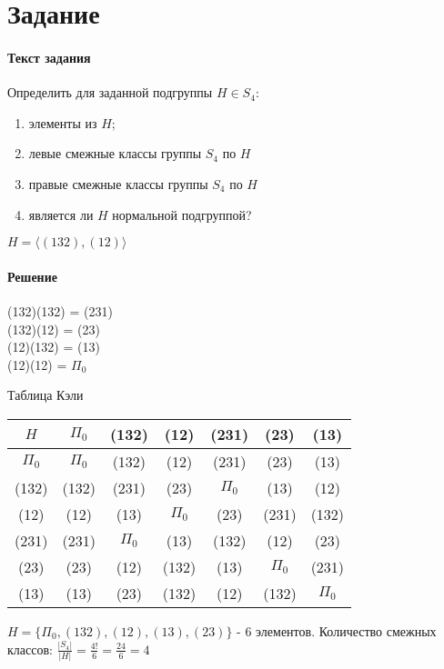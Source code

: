 \documentclass[a4paper, 12pt]{article}
\newcommand{\RNum}[1]{\uppercase\expandafter{\romannumeral #1\relax}}
\begin{document}
\section*{Задание \RNum{3}}
\paragraph{Текст задания} Определить для заданной подгруппы $ H \in S_4$:
\begin{enumerate}[label=\asbuk*),ref=\asbuk*]
    \item элементы из $H$;
    \item левые смежные классы группы $ S_4 $ по $ H $
    \item правые смежные классы группы $ S_4 $ по $ H $
    \item является ли $ H $  нормальной подгруппой?
\end{enumerate}
$ H =  \langle(132), (12)\rangle $
\paragraph{Решение} 
(132)(132) = (231) \\ (132)(12) = (23) \\ (12)(132) = (13) \\ (12)(12) = $\Pi_0 $
\begin{center}
    Таблица Кэли\\
    \begin{tabular}{|c||c|c|c|c|c|c|}
        \hline
        $ H $ & $\Pi_{0}$ & (132) & (12) & (231) & (23) & (13) \\
        \hline\hline
        $ \Pi_0 $ & $ \Pi_0 $ & (132) & (12) & (231) & (23) & (13) \\
        \hline
        (132) & (132) & (231) & (23) & $\Pi_0$ & (13) & (12) \\
        \hline
        (12) & (12) & (13) & $ \Pi_0$ & (23) & (231) & (132) \\
        \hline
        (231) & (231) & $\Pi_0$ & (13) & (132) & (12) & (23) \\
        \hline
        (23) & (23) & (12) & (132) & (13) & $\Pi_0$ & (231) \\ 
        \hline
        (13) & (13) & (23) & (132) & (12) & (132) & $ \Pi_0 $ \\
        \hline
    \end{tabular}
\end{center}
$ H = \{\Pi_0, (132), (12), (13), (23) \} $ - 6 элементов.
Количество смежных классов: $ \frac{|S_4|}{|H|} = \frac{4!}{6} = \frac{24}{6} = 4 $
\end{document}
